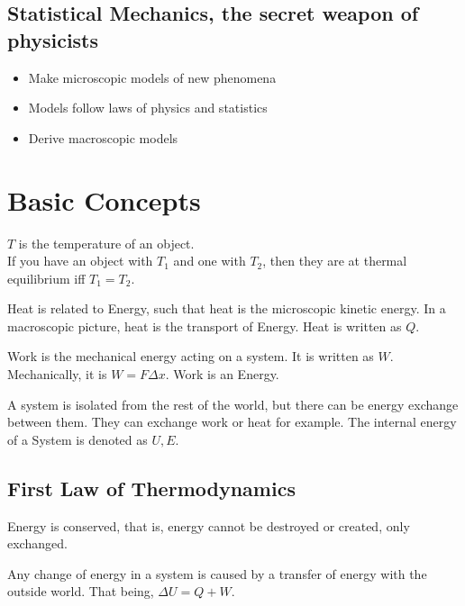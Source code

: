 \documentclass[]{scrartcl}
\begin{document}
\subsection{Statistical Mechanics, the secret weapon of physicists}
\begin{itemize}
	\item Make microscopic models of new phenomena
	\item Models follow laws of physics and statistics
	\item Derive macroscopic models
\end{itemize}

\section{Basic Concepts}

$T$ is the temperature of an object.\\
If you have an object with $T_1$ and one with $T_2$, then they are at thermal equilibrium iff $T_1 = T_2$.

Heat is related to Energy, such that heat is the microscopic kinetic energy. In a macroscopic picture, heat is the transport of Energy. Heat is written as $Q$.

Work is the mechanical energy acting on a system. It is written as $W$. Mechanically, it is $W = F\Delta x$. Work is an Energy.

A system is isolated from the rest of the world, but there can be energy exchange between them. They can exchange work or heat for example. The internal energy of a System is denoted as $U, E$.

\subsection{First Law of Thermodynamics}
Energy is conserved, that is, energy cannot be destroyed or created, only exchanged.

Any change of energy in a system is caused by a transfer of energy with the outside world. That being, $\Delta U = Q + W$.
\end{document}
